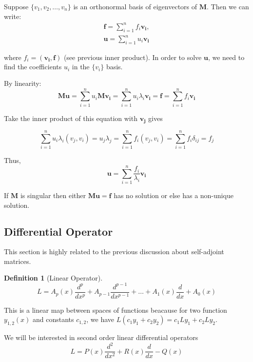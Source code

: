 \documentclass{article}
\theoremstyle{definition}
\newtheorem{definition}{Definition}[section]
\begin{document}
Suppose $\{v_1,v_2,\ldots,v_n\}$ is an orthonormal basis of eigenvectors of $\mathbf{M}$. Then we can write:
\begin{align}
\mathbf{f}=\sum_{i=1}^{n}f_i\mathbf{v_i},\\
\mathbf{u}=\sum_{i=1}^{n}u_i\mathbf{v_i}
\end{align}

where $f_i=(\mathbf{v_i},\mathbf{f})$ (see previous inner product). In order to solve $\mathbf{u}$, we need to find the coefficients $u_i$ in the $\{v_i\}$ basis.


By linearity:
\begin{equation}
\mathbf{Mu}=\sum_{i=1}^{n}u_i \mathbf{Mv_i}=\sum_{i=1}^{n}u_i\lambda_i\mathbf{v_i}=\mathbf{f}=\sum_{i=1}^n f_i\mathbf{v_i}
\end{equation}


Take the inner product of this equation with $\mathbf{v_j}$ gives

\begin{equation}
\sum_{i=1}^n u_i\lambda_i(v_j,v_i)=u_j\lambda_j=\sum_{i=1}^nf_i(v_j,v_i)=\sum_{i=1}^n f_i\delta_{ij}=f_j
\end{equation}

Thus,
\begin{equation}
\mathbf{u}=\sum_{i=1}^n\frac{f_i}{\lambda_i}\mathbf{v_i}
\end{equation}


If $\mathbf{M}$ is singular then either $\mathbf{Mu=f}$ has no solution or else has a non-unique solution.


\subsection{Differential Operator}

This section is highly related to the previous discussion about self-adjoint matrices.

\begin{definition}[Linear Operator]
\begin{equation}
L=A_p(x)\frac{d^p}{dx^p}+A_{p-1}\frac{d^{p-1}}{dx^{p-1}} + \ldots + A_1(x)\frac{d}{dx}+A_0(x)
\end{equation}
\end{definition}

This is a linear map between spaces of functions beacause for two function $y_{1,2}(x)$ and constants $c_{1,2}$, we have $L(c_1y_1+c_2y_2)=c_1Ly_1+c_2Ly_2$.

We will be interested in second order linear differential operators
\begin{equation}
L=P(x)\frac{d^2}{dx^2}+R(x)\frac{d}{dx}-Q(x)
\end{equation}
\end{document}
